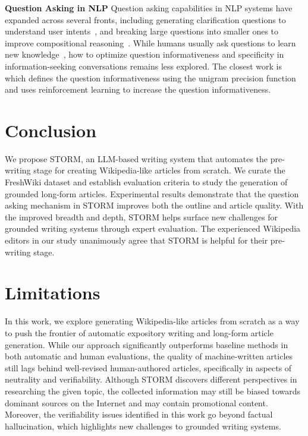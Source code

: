 \documentclass[11pt]{article}
\newcommand{\system}[0]{STORM\xspace}
\begin{document}
\noindent
\textbf{Question Asking in NLP}\quad
Question asking capabilities in NLP systems have expanded across several fronts, including generating clarification questions to understand user intents~\citep{aliannejadi2019asking, rahmani-etal-2023-survey}, and breaking large questions into smaller ones to improve compositional reasoning~\citep{press-etal-2023-measuring}. While humans usually ask questions to learn new knowledge~\citep{tawfik2020role,booth2003craft}, how to optimize question informativeness and specificity in information-seeking conversations remains less explored. The closest work is~\citet{qi-etal-2020-stay} which defines the question informativeness using the unigram precision function and uses reinforcement learning to increase the question informativeness.





\section{Conclusion}

\label{sec:conclusion}
We propose \system, an LLM-based writing system that automates the pre-writing stage for creating Wikipedia-like articles from scratch. We curate the FreshWiki dataset and establish evaluation criteria to study the generation of grounded long-form articles. Experimental results demonstrate that the question asking mechanism in \system improves both the outline and article quality. 
With the improved breadth and depth, \system helps surface new challenges for grounded writing systems through expert evaluation. The experienced Wikipedia editors in our study unanimously agree that \system is helpful for their pre-writing stage.





\section*{Limitations}

In this work, we explore generating Wikipedia-like articles from scratch as a way to push the frontier of automatic expository writing and long-form article generation. While our approach significantly outperforms baseline methods in both automatic and human evaluations, the quality of machine-written articles still lags behind well-revised human-authored articles, specifically in aspects of neutrality and verifiability. Although \system discovers different perspectives in researching the given topic, the collected information may still be biased towards dominant sources on the Internet and may contain promotional content. Moreover, the verifiability issues identified in this work go beyond factual hallucination, which highlights new challenges to grounded writing systems.
\end{document}
